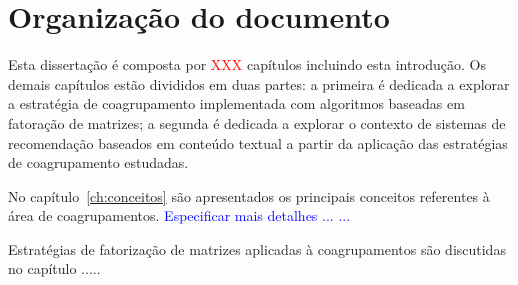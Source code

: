\documentclass[
    12pt,                %
    oneside,            %
    a4paper,            %
    english,            %
    brazil                %
    ]{abntex2ppgsi}
\begin{document}




\section{Organização do documento}

Esta dissertação é composta por \textcolor{red}{XXX} capítulos incluindo esta introdução. Os demais capítulos estão divididos em duas partes: a primeira é dedicada a explorar a estratégia  de coagrupamento implementada com algoritmos baseadas em fatoração de matrizes; a segunda é dedicada a explorar o contexto de sistemas de recomendação baseados em conteúdo textual a partir da aplicação das estratégias de coagrupamento estudadas.

No capítulo~\ref{ch:conceitos} são apresentados os principais conceitos referentes à área de coagrupamentos. \textcolor{blue}{Especificar mais detalhes ... ... }

Estratégias de fatorização de matrizes aplicadas à coagrupamentos são discutidas no capítulo .....
\end{document}
